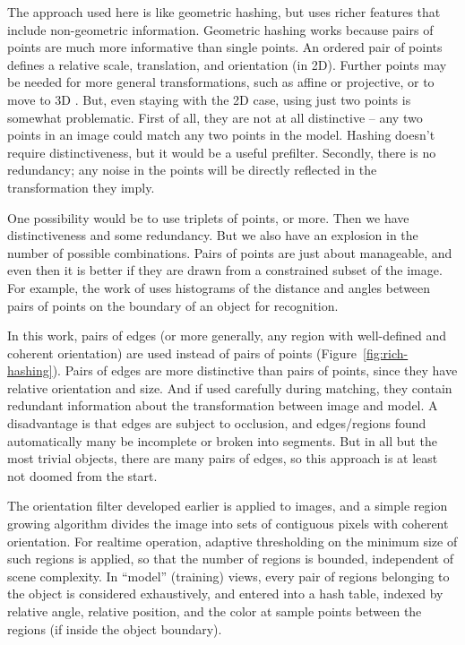 The approach used here is like geometric hashing, but uses
richer features that include non-geometric information.
%
Geometric hashing works because pairs of points are much more
informative than single points.  An ordered pair of points defines a
relative scale, translation, and orientation (in 2D).  Further points
may be needed for more general transformations, such as affine
or projective, or to move to 3D \cite[]{wolfson97geometric}.
%
But, even staying with the 2D case, using just two points is somewhat
problematic.  First of all, they are not at all distinctive -- any two
points in an image could match any two points in the model.  Hashing
doesn't require distinctiveness, but it would be a useful prefilter.
Secondly, there is no redundancy; any noise in the points will be
directly reflected in the transformation they imply.

One possibility would be to use triplets of points, or more.  Then we
have distinctiveness and some redundancy.  But we also have an
explosion in the number of possible combinations.  Pairs of points are
just about manageable, and even then it is better if they are drawn
from a constrained subset of the image.  For example, the work of
\cite{roy02learning} uses histograms of the distance and angles
between pairs of points on the boundary of an object for recognition.

In this work, pairs of edges (or more generally, any region with
well-defined and coherent orientation) are used instead of pairs of
points (Figure~\ref{fig:rich-hashing}).
%
Pairs of edges are more distinctive than pairs of points,
since they have relative orientation and size.  And if used carefully
during matching, they contain redundant information about the
transformation between image and model.  A disadvantage is that edges
are subject to occlusion, and edges/regions found automatically
many be incomplete or broken into segments.  But in all but the most
trivial objects, there are many pairs of edges, so this approach is
at least not doomed from the start.

The orientation filter developed earlier is applied to images, and a
simple region growing algorithm divides the image into sets of
contiguous pixels with coherent orientation.  For realtime operation,
adaptive thresholding on the minimum size of such regions is applied,
so that the number of regions is bounded, independent of scene
complexity.  In ``model'' (training) views, every pair of regions
belonging to the object is considered exhaustively, and entered into a
hash table, indexed by relative angle, relative position, and the
color at sample points between the regions (if inside the object
boundary).  

